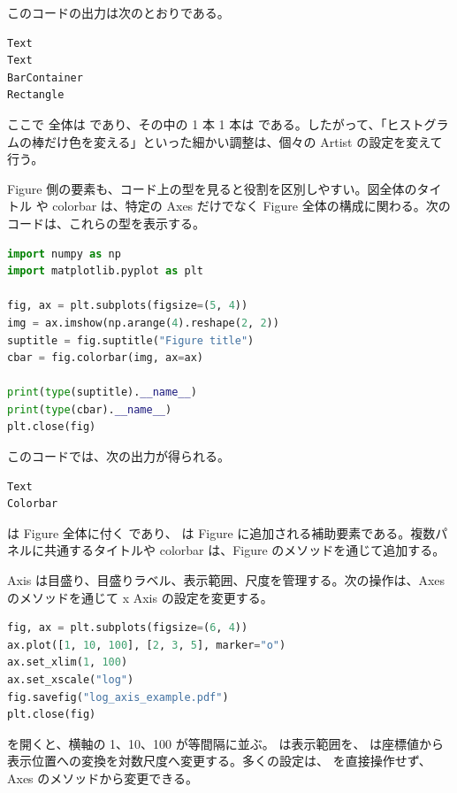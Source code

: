 \noindent このコードの出力は次のとおりである。

\begin{lstlisting}[numbers=none, xleftmargin=2\zw]
Text
Text
BarContainer
Rectangle
\end{lstlisting}

ここで  全体は  であり、その中の 1 本 1 本は  である。したがって、「ヒストグラムの棒だけ色を変える」といった細かい調整は、個々の Artist の設定を変えて行う。

Figure 側の要素も、コード上の型を見ると役割を区別しやすい。図全体のタイトル  や colorbar は、特定の Axes だけでなく Figure 全体の構成に関わる。次のコードは、これらの型を表示する。

\begin{lstlisting}[language=Python]
import numpy as np
import matplotlib.pyplot as plt

fig, ax = plt.subplots(figsize=(5, 4))
img = ax.imshow(np.arange(4).reshape(2, 2))
suptitle = fig.suptitle("Figure title")
cbar = fig.colorbar(img, ax=ax)

print(type(suptitle).__name__)
print(type(cbar).__name__)
plt.close(fig)
\end{lstlisting}

\noindent このコードでは、次の出力が得られる。

\begin{lstlisting}[numbers=none, xleftmargin=2\zw]
Text
Colorbar
\end{lstlisting}

 は Figure 全体に付く  であり、 は Figure に追加される補助要素である。複数パネルに共通するタイトルや colorbar は、Figure のメソッドを通じて追加する。

Axis は目盛り、目盛りラベル、表示範囲、尺度を管理する。次の操作は、Axes のメソッドを通じて x Axis の設定を変更する。

\begin{lstlisting}[language=Python]
fig, ax = plt.subplots(figsize=(6, 4))
ax.plot([1, 10, 100], [2, 3, 5], marker="o")
ax.set_xlim(1, 100)
ax.set_xscale("log")
fig.savefig("log_axis_example.pdf")
plt.close(fig)
\end{lstlisting}

 を開くと、横軸の 1、10、100 が等間隔に並ぶ。 は表示範囲を、 は座標値から表示位置への変換を対数尺度へ変更する。多くの設定は、 を直接操作せず、Axes のメソッドから変更できる。

